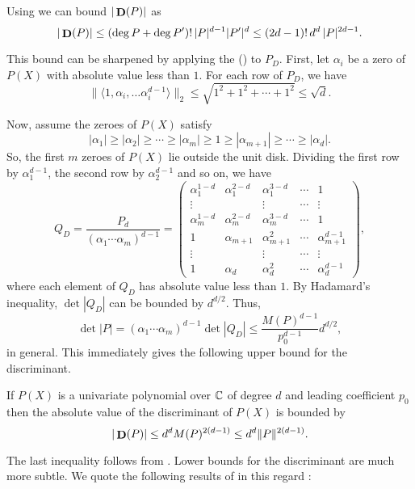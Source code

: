 \medskip
Using  we can bound $|\mathop{\mathbf{D}}\nolimits(P)|$ as
\begin{equation}\label{PB:DiscrmBound1:Eq}
|\mathop{\mathbf{D}}\nolimits(P)| \le (\deg P + \deg P')! \,|P|^{d-1} |P'|^d \le (2d-1)! \,d^d\,
|P|^{2d-1}.
\end{equation}


This bound can be sharpened by applying the 
() to $P_D$.  First, let $\alpha_i$ be a 
zero of $P(X)$ with absolute value less than $1$.  For each row
of $P_D$, we have
\[
\|\langle 1, \alpha_i, \ldots \alpha_i^{d-1} \rangle\|_2
\le \sqrt{1^2 + 1^2 + \cdots + 1^2} \le \sqrt{d}.
\]

Now, assume the zeroes of $P(X)$ satisfy
\[
|\alpha_1| \ge |\alpha_2| \ge \cdots \ge |\alpha_m| \ge 1 \ge |\alpha_{m+1}|
\ge \cdots \ge |\alpha_d|.
\]
So, the first $m$ zeroes of $P(X)$ lie outside the unit disk.
Dividing the first row by $\alpha_1^{d-1}$, the second row by
$\alpha_2^{d-1}$ and so on, we have
\[
Q_D = \frac{P_d}{(\alpha_1 \cdots \alpha_m)^{d-1}} =
\left(\begin{array}{ccccccc}
\alpha_1^{1-d} & \alpha_1^{2-d} & \alpha_1^{3-d} & \cdots & 1 \\
\vdots & & \vdots & \cdots & \vdots \\
\alpha_m^{1-d} & \alpha_m^{2-d} & \alpha_m^{3-d} & \cdots & 1 \\
1 & \alpha_{m+1} & \alpha_{m+1}^2 & \cdots & \alpha_{m+1}^{d-1} \\
\vdots & & \vdots & \cdots & \vdots \\
1 & \alpha_d & \alpha_d^2 & \cdots & \alpha_d^{d-1} 
\end{array}\right),
\]
where each element of $Q_D$ has absolute value less than $1$.  By
Hadamard's inequality, $\det|Q_D|$ can be bounded by $d^{d/2}$.
Thus,
\[
\det|P|= (\alpha_1 \cdots \alpha_m)^{d-1} \det|Q_D| \le 
\frac{M(P)^{d-1}}{p_0^{d-1}} d^{d/2},
\]
in general.  This immediately gives the following upper bound for the
discriminant. 

\begin{proposition}
If $P(X)$ is a univariate polynomial over $\mathbb{C}$ of degree $d$ and
leading coefficient $p_0$ then the absolute value of the discriminant
of $P(X)$ is bounded by
\[
|\mathop{\mathbf{D}}\nolimits(P)| \le d^d M(P)^{2(d-1)} \le d^d \|P\|^{2(d-1)}.
\]
\end{proposition}

The last inequality follows from .  Lower
bounds for the discriminant are much more subtle.  We quote the
following results of {\Odlyzko} in this regard \cite{Odlyzko1975-do,Odlyzko1977-rt}:

